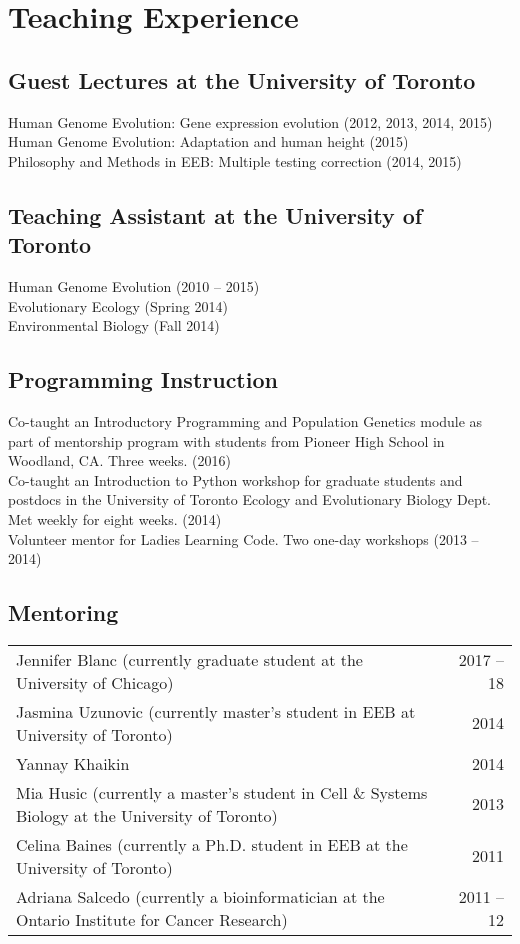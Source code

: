 \documentclass[letterpaper]{article}
\begin{document}
\section*{Teaching Experience}
\subsection*{Guest Lectures at the University of Toronto}
Human Genome Evolution: Gene expression evolution (2012, 2013, 2014, 2015)\\
Human Genome Evolution: Adaptation and human height (2015)\\
Philosophy and Methods in EEB: Multiple testing correction (2014, 2015)
\subsection*{Teaching Assistant at the University of Toronto}
Human Genome Evolution (2010 -- 2015) \\ 
Evolutionary Ecology (Spring 2014) \\
Environmental Biology (Fall 2014)

\subsection*{Programming Instruction}
Co-taught an Introductory Programming and Population Genetics module as part of mentorship program with students from Pioneer High School in Woodland, CA. Three weeks. (2016) \\[.5ex]
Co-taught an Introduction to Python workshop for graduate students and postdocs in the University of Toronto Ecology and Evolutionary Biology Dept. Met weekly for eight weeks. (2014) \\[.5ex]
Volunteer mentor for Ladies Learning Code. Two one-day workshops (2013 -- 2014) \\[.5ex]


\subsection*{Mentoring}
 \begin{tabular}{MN}
Jennifer Blanc (currently graduate student at the University of Chicago) & 2017 -- 18 \\
 
Jasmina Uzunovic (currently master's student in EEB at University of Toronto) & 2014 \\
Yannay Khaikin & 2014 \\
Mia Husic (currently a master's student in Cell \& Systems Biology at the University of Toronto) & 2013 \\
Celina Baines (currently a Ph.D. student in EEB at the University of Toronto) & 2011 \\
Adriana Salcedo (currently a bioinformatician at the Ontario Institute for Cancer Research) & 2011 -- 12
 \end{tabular}
\end{document}
